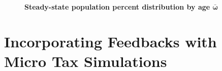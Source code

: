 \documentclass[12pt]{report}
\theoremstyle{definition}
\begin{document}
  \begin{figure}[htbp]\centering \captionsetup{width=4.0in}
    \caption{\label{FigSSpopdist}\textbf{Steady-state population percent distribution by age $\bm{\bar{\omega}}$}}
  \end{figure}
  \clearpage



\section{Incorporating Feedbacks with Micro Tax Simulations}\label{SecMicro}
\end{document}
